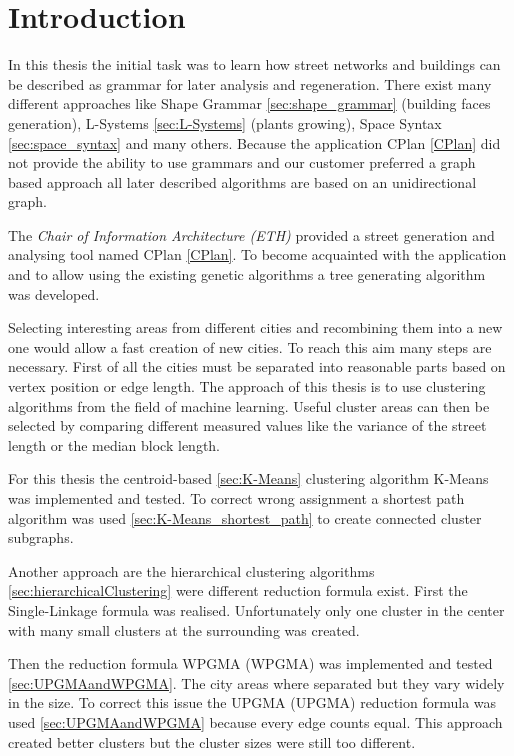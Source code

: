 \chapter{Introduction}
In this thesis the initial task was to learn how street networks and buildings can be described as grammar for later analysis and regeneration. There exist many different approaches like Shape Grammar \ref{sec:shape_grammar} (building faces generation), L-Systems \ref{sec:L-Systems} (plants growing), Space Syntax \ref{sec:space_syntax} and many others. 
Because the application CPlan \ref{CPlan} did not provide the ability to use grammars and our customer preferred a graph based approach all later described algorithms are based on an unidirectional graph.

The \textit{Chair of Information Architecture (ETH)} provided a street generation and analysing tool named CPlan \ref{CPlan}. To become acquainted with the application and to allow using the existing genetic algorithms a tree generating algorithm was developed. 

Selecting interesting areas from different cities and recombining them into a new one would allow a fast creation of new cities. To reach this aim many steps are necessary. First of all the cities must be separated into reasonable parts based on vertex position or edge length. The approach of this thesis is to use clustering algorithms from the field of machine learning. Useful cluster areas can then be selected by comparing different measured values like the variance of the street length or the median block length.

For this thesis the centroid-based \ref{sec:K-Means} clustering algorithm K-Means was implemented and tested. To correct wrong assignment a shortest path algorithm was used \ref{sec:K-Means_shortest_path} to create connected cluster subgraphs.

Another approach are the hierarchical clustering algorithms \ref{sec:hierarchicalClustering} were different reduction formula exist. First the Single-Linkage formula was realised. Unfortunately only one cluster in the center with many small clusters at the surrounding was created.

\newpage

Then the reduction formula \acrshort{WPGMA} (\acrlong{WPGMA}) was implemented and tested \ref{sec:UPGMAandWPGMA}. The city areas where separated but they vary widely in the size. To correct this issue the \acrshort{UPGMA} (\acrlong{UPGMA}) reduction formula was used \ref{sec:UPGMAandWPGMA} because every edge counts equal. This approach created better clusters but the cluster sizes were still too different.

